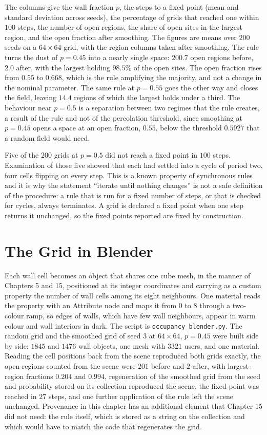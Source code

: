 The columns give the wall fraction $p$, the steps to a fixed point (mean and standard deviation across seeds), the percentage of grids that reached one within $100$ steps, the number of open regions, the share of open sites in the largest region, and the open fraction after smoothing. The figures are means over $200$ seeds on a $64\times64$ grid, with the region columns taken after smoothing. The rule turns the dust of $p=0.45$ into a nearly single space: $200.7$ open regions before, $2.0$ after, with the largest holding $98.5\%$ of the open sites. The open fraction rises from $0.55$ to $0.668$, which is the rule amplifying the majority, and not a change in the nominal parameter. The same rule at $p=0.55$ goes the other way and closes the field, leaving $14.4$ regions of which the largest holds under a third. The behaviour near $p=0.5$ is a separation between two regimes that the rule creates, a result of the rule and not of the percolation threshold, since smoothing at $p=0.45$ opens a space at an open fraction, $0.55$, below the threshold $0.5927$ that a random field would need.

Five of the $200$ grids at $p=0.5$ did not reach a fixed point in $100$ steps. Examination of those five showed that each had settled into a cycle of period two, four cells flipping on every step. This is a known property of synchronous rules and it is why the statement ``iterate until nothing changes'' is not a safe definition of the procedure: a rule that is run for a fixed number of steps, or that is checked for cycles, always terminates. A grid is declared a fixed point when one step returns it unchanged, so the fixed points reported are fixed by construction.

\section{The Grid in Blender}

Each wall cell becomes an object that shares one cube mesh, in the manner of Chapters 5 and 15, positioned at its integer coordinates and carrying as a custom property the number of wall cells among its eight neighbours. One material reads the property with an Attribute node and maps it from $0$ to $8$ through a two-colour ramp, so edges of walls, which have few wall neighbours, appear in warm colour and wall interiors in dark. The script is \texttt{occupancy\_blender.py}. The random grid and the smoothed grid of seed $3$ at $64\times 64$, $p=0.45$ were built side by side: $1845$ and $1476$ wall objects, one mesh with $3321$ users, and one material. Reading the cell positions back from the scene reproduced both grids exactly, the open regions counted from the scene were $201$ before and $2$ after, with largest-region fractions $0.204$ and $0.994$, regeneration of the smoothed grid from the seed and probability stored on its collection reproduced the scene, the fixed point was reached in $27$ steps, and one further application of the rule left the scene unchanged. Provenance in this chapter has an additional element that Chapter 15 did not need: the rule itself, which is stored as a string on the collection and which would have to match the code that regenerates the grid.

